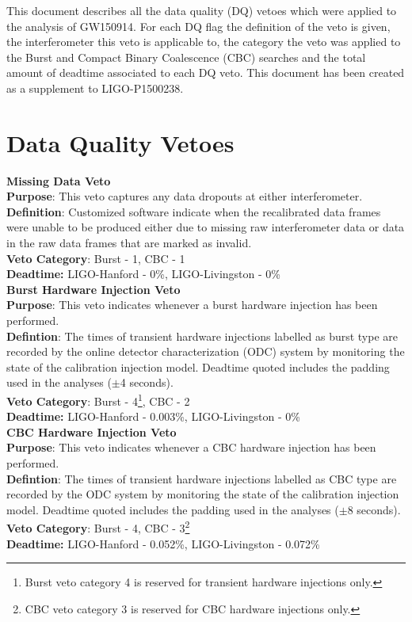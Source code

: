 This document describes all the data quality (DQ) vetoes which were applied to
the analysis of GW150914. For each DQ flag the definition of the veto is given,
the interferometer this veto is applicable to, the category the veto was
applied to the Burst and Compact Binary Coalescence (CBC) searches and the
total amount of deadtime associated to each DQ veto. This document has been
created as a supplement to LIGO-P1500238.

\section{Data Quality Vetoes}

\textbf{Missing Data Veto} \\
\textbf{Purpose}: This veto captures any data dropouts at either interferometer.\\
\textbf{Definition}: Customized software indicate when the recalibrated data
frames were unable to be produced either due to missing raw interferometer data
or data in the raw data frames that are marked as invalid.\\
\textbf{Veto Category}: Burst - 1, CBC - 1\\
\textbf{Deadtime:} LIGO-Hanford - 0\%, LIGO-Livingston - 0\%
\\

\textbf{Burst Hardware Injection Veto} \\
\textbf{Purpose}: This veto indicates whenever a burst hardware injection has
been performed.\\
\textbf{Defintion}: The times of transient hardware injections labelled as
burst type are recorded by the online detector characterization (ODC) system by
monitoring the state of the calibration injection model. Deadtime quoted
includes the padding used in the analyses ($\pm$4 seconds).\\
\textbf{Veto Category}: Burst - 4\footnote{Burst veto category 4 is reserved
for transient hardware injections only.}, CBC - 2\\
\textbf{Deadtime:} LIGO-Hanford - 0.003\%, LIGO-Livingston - 0\%
\\

\textbf{CBC Hardware Injection Veto} \\
\textbf{Purpose}: This veto indicates whenever a CBC hardware injection has
been performed.\\
\textbf{Defintion}: The times of transient hardware injections labelled as CBC
type are recorded by the ODC system by monitoring the state of the
calibration injection model. Deadtime quoted includes the padding used in the
analyses ($\pm$8 seconds).\\
\textbf{Veto Category}: Burst - 4, CBC - 3\footnote{CBC veto category 3 is
reserved for CBC hardware injections only.}\\
\textbf{Deadtime:} LIGO-Hanford - 0.052\%, LIGO-Livingston - 0.072\%
\\


